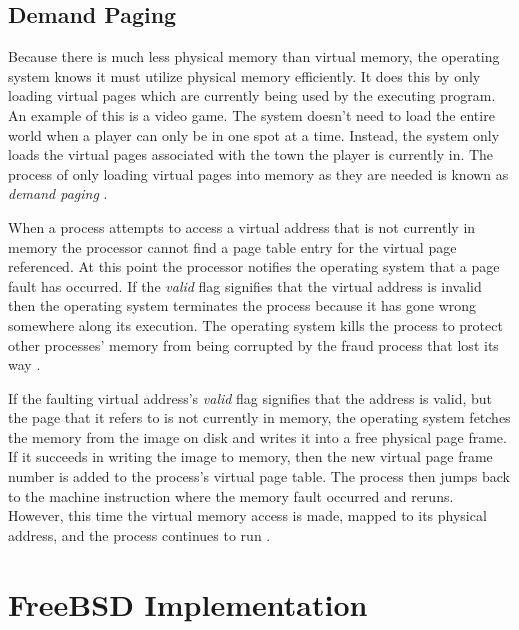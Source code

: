 \documentclass[onecolumn,draftclsnofoot, 10pt, compsoc]{IEEEtran}
\begin{document}
	\subsection{Demand Paging}
		Because there is much less physical memory than virtual memory, the operating system knows it must utilize physical memory efficiently.
		It does this by only loading virtual pages which are currently being used by the executing program.
		An example of this is a video game.
		The system doesn't need to load the entire world when a player can only be in one spot at a time.
		Instead, the system only loads the virtual pages associated with the town the player is currently in. The process of only loading virtual pages into memory as they are needed is known as \textit{demand paging} \cite{linuxMM}.
		
		When a process attempts to access a virtual address that is not currently in memory the processor cannot find a page table entry for the virtual page referenced. 
		At this point the processor notifies the operating system that a page fault has occurred.
		If the \textit{valid} flag signifies that the virtual address is invalid then the operating system terminates the process because it has gone wrong somewhere along its execution.
		The operating system kills the process to protect other processes' memory from being corrupted by the fraud process that lost its way \cite{linuxMM}.

		If the faulting virtual address's \textit{valid} flag signifies that the address is valid, but the page that it refers to is not currently in memory, the operating system fetches the memory from the image on disk and writes it into a free physical page frame.
		If it succeeds in writing the image to memory, then the new virtual page frame number is added to the process's virtual page table. 
		The process then jumps back to the machine instruction where the memory fault occurred and reruns. 
		However, this time the virtual memory access is made, mapped to its physical address, and the process continues to run \cite{linuxMM}.

\section{FreeBSD Implementation}
\end{document}
